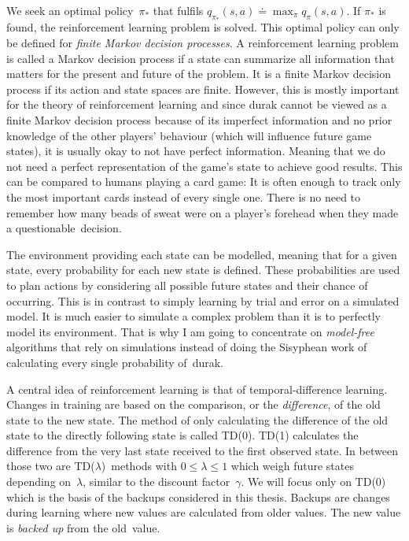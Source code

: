 \documentclass[a4paper,titlepage]{article}
\begin{document}
We seek an optimal policy~$\pi_*$ that fulfils $q_{\pi_*}(s, a) \doteq \max_\pi q_\pi(s, a)$. If $\pi_*$ is found, the reinforcement learning problem is solved. This optimal policy can only be defined for \emph{finite Markov decision processes}. A reinforcement learning problem is called a Markov decision process if a state can summarize all information that matters for the present and future of the problem. It is a finite Markov decision process if its action and state spaces are finite. However, this is mostly important for the theory of reinforcement learning and since durak cannot be viewed as a finite Markov decision process because of its imperfect information and no prior knowledge of the other players' behaviour (which will influence future game states), it is usually okay to not have perfect information. Meaning that we do not need a perfect representation of the game's state to achieve good results. This can be compared to humans playing a card game: It is often enough to track only the most important cards instead of every single one. There is no need to remember how many beads of sweat were on a player's forehead when they made a questionable~decision. \medskip

The environment providing each state can be modelled, meaning that for a given state, every probability for each new state is defined. These probabilities are used to plan actions by considering all possible future states and their chance of occurring. This is in contrast to simply learning by trial and error on a simulated model. It is much easier to simulate a complex problem than it is to perfectly model its environment. That is why I am going to concentrate on \emph{model-free} algorithms that rely on simulations instead of doing the Sisyphean work of calculating every single probability of~durak.

A central idea of reinforcement learning is that of temporal-difference learning. Changes in training are based on the comparison, or the \emph{difference}, of the old state to the new state. The method of only calculating the difference of the old state to the directly following state is called TD(0). TD(1) calculates the difference from the very last state received to the first observed state. In between those two are TD($\lambda$)~methods with $0 \leq \lambda \leq 1$ which weigh future states depending on~$\lambda$, similar to the discount factor~$\gamma$. We will focus only on TD(0) which is the basis of the backups considered in this thesis. Backups are changes during learning where new values are calculated from older values. The new value is \emph{backed up} from the old~value.
\end{document}
